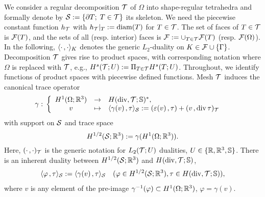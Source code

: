 \documentclass[11pt]{article}
\begin{document}
We consider a regular decomposition $\mathcal{T}$ of $\Omega$ into shape-regular tetrahedra
and formally denote by $\mathcal{S}:=\{\partial T;\;T\in\mathcal{T}\}$ its skeleton.
We need the piecewise constant function $h_{\mathcal{T}}$ with $h_{\mathcal{T}}|_T:=\operatorname{diam}(T)$
for $T\in\mathcal{T}$.
The set of faces of $T\in\mathcal{T}$ is $\mathcal{F}(T)$, and the sets of all (resp. interior) faces is
$\mathcal{F}:=\cup_{T\in\mathcal{T}}\mathcal{F}(T)$ (resp. $\mathcal{F}(\Omega)$). In the following,
$\langle{}\cdot\hspace*{.5mm},\cdot\rangle_K$ denotes the generic $L_2$-duality on $K\in\mathcal{F}\cup\{\Gamma\}$.
Decomposition $\mathcal{T}$ gives rise to product spaces, with corresponding notation
where $\Omega$ is replaced with $\mathcal{T}$, e.g., $H^s(\mathcal{T};U):=\Pi_{T\in\mathcal{T}} H^s(T;U)$.
Throughout, we identify functions of product spaces with piecewise defined functions.
Mesh $\mathcal{T}$ induces the canonical trace operator
\begin{align*}
   \gamma:\;&\left\{\begin{array}{cll}
               H^1(\Omega;\mathbb{R}^3) &\rightarrow& H(\operatorname{div},\mathcal{T};\mathbb{S})^*,\\
               v &\mapsto& \langle{}\gamma(v)\hspace*{.5mm},\tau\rangle_{\mathcal{S}}
               := (\varepsilon(v)\hspace*{.5mm},\tau) + (v\hspace*{.5mm},\operatorname{div}\tau)_{\mathcal{T}}
            \end{array}\right.
\end{align*}
with support on $\mathcal{S}$ and trace space
\[
   H^{1/2}(\mathcal{S};\mathbb{R}^3) := \gamma(H^1(\Omega;\mathbb{R}^3)).
\]
Here, $(\cdot\hspace*{.5mm},\cdot)_{\mathcal{T}}$ is the generic notation for
$L_2(\mathcal{T};U)$ dualities, $U\in\{\mathbb{R},\mathbb{R}^3,\mathbb{S}\}$.
There is an inherent duality between $H^{1/2}(\mathcal{S};\mathbb{R}^3)$ and $H(\operatorname{div},\mathcal{T};\mathbb{S})$,
\begin{align} \label{duality}
   \langle{}\varphi\hspace*{.5mm},\tau\rangle_{\mathcal{S}} := \langle{}\gamma(v)\hspace*{.5mm},\tau\rangle_{\mathcal{S}}
   \quad (\varphi\in H^{1/2}(\mathcal{S};\mathbb{R}^3), \tau\in H(\operatorname{div},\mathcal{T};\mathbb{S})),
\end{align}
where $v$ is any element of the pre-image $\gamma^{-1}(\varphi)\subset H^1(\Omega;\mathbb{R}^3)$,
$\varphi=\gamma(v)$.
\end{document}
